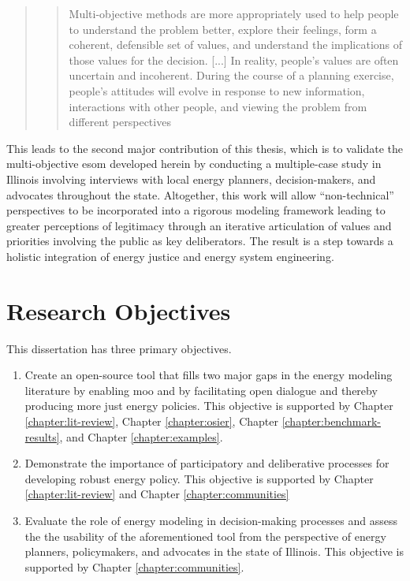 \begin{quote}
    \blockcquote[p.12]{hobbs_optimization_1995}{Multi-objective methods are more
    appropriately used to help people to understand the problem better, explore
    their feelings, form a coherent, defensible set of values, and understand
    the implications of those values for the decision. [...] In reality,
    people's values are often uncertain and incoherent. During the course of a
    planning exercise, people's attitudes will evolve in response to new
    information, interactions with other people, and viewing the problem from
    different perspectives}
\end{quote}

This leads to the second major contribution of this thesis, which is to validate
the multi-objective \ac{esom} developed herein by conducting a multiple-case
study in Illinois involving interviews with local energy planners,
decision-makers, and advocates throughout the state. Altogether, this work will
allow ``non-technical'' perspectives to be incorporated into a rigorous modeling
framework leading to greater perceptions of legitimacy through an iterative
articulation of values and priorities involving the public as key deliberators.
The result is a step towards a holistic integration of energy justice and energy
system engineering.

\section{Research Objectives}

This dissertation has three primary objectives. 
\begin{enumerate}
    \item Create an open-source tool that fills two major gaps in the energy
    modeling literature by enabling \acf{moo} and by facilitating open dialogue
    and thereby producing more just energy policies. This objective is supported
    by Chapter \ref{chapter:lit-review}, Chapter \ref{chapter:osier}, Chapter
    \ref{chapter:benchmark-results}, and Chapter \ref{chapter:examples}.
    \item Demonstrate the importance of participatory and deliberative processes
    for developing robust energy policy. This objective is supported by Chapter
    \ref{chapter:lit-review} and Chapter \ref{chapter:communities}
    \item Evaluate the role of energy modeling in decision-making processes and
    assess the the usability of the aforementioned tool from the perspective of
    energy planners, policymakers, and advocates in the state of Illinois. This
    objective is supported by Chapter \ref{chapter:communities}.
\end{enumerate}

